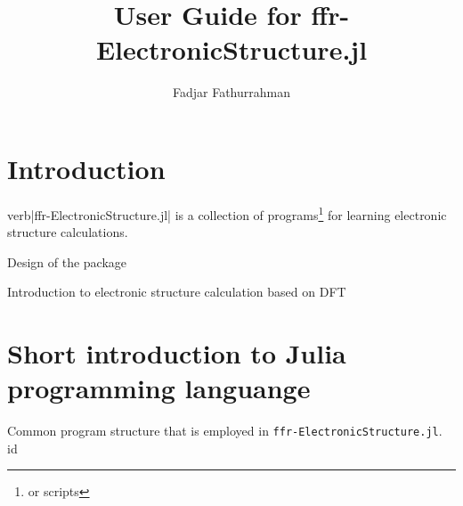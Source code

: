 \documentclass[a4paper,11pt]{extarticle}
\begin{document}
\title{User Guide for {\ttfamily ffr-ElectronicStructure.jl}}
\author{Fadjar Fathurrahman}
\date{}
\maketitle

\tableofcontents

\section{Introduction}

verb|ffr-ElectronicStructure.jl| is a collection of programs\footnote{or scripts}
for learning electronic structure calculations.

Design of the package

Introduction to electronic structure calculation based on DFT

\section{Short introduction to Julia programming languange}

Common program structure that is employed in {\tt ffr-ElectronicStructure.jl}.
id
\end{document}
